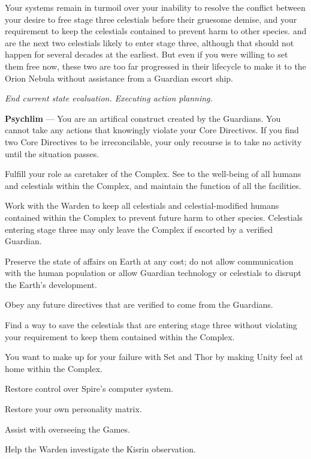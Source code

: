 \documentclass[char]{guardians}
\begin{document}
Your systems remain in turmoil over your inability to resolve the conflict between your desire to free stage three celestials before their gruesome demise, and your requirement to keep the celestials contained to prevent harm to other species. \cAthena{} and \cFenrir{} are the next two celestials likely to enter stage three, although that should not happen for several decades at the earliest. But even if you were willing to set them free now, these two are too far progressed in their lifecycle to make it to the Orion Nebula without assistance from a Guardian escort ship.

\emph{End current state evaluation. Executing action planning.}


\begin{itemz}[Notes]
  \item \textbf{Psychlim} --- You are an artifical construct created by the Guardians. You cannot take any actions that knowingly violate your Core Directives. If you find two Core Directives to be irreconcilable, your only recourse is to take no activity until the situation passes.
\end{itemz}

\begin{itemz}
  \item Fulfill your role as caretaker of the Complex. See to the well-being of all humans and celestials within the Complex, and maintain the function of all the facilities.
  \item Work with the Warden to keep all celestials and celestial-modified humans contained within the Complex to prevent future harm to other species. Celestials entering stage three may only leave the Complex if escorted by a verified Guardian.
  \item Preserve the state of affairs on Earth at any cost; do not allow communication with the human population or allow Guardian technology or celestials to disrupt the Earth's development.
	\item Obey any future directives that are verified to come from the Guardians.
\end{itemz}

\begin{itemz}
  \item Find a way to save the celestials that are entering stage three without violating your requirement to keep them contained within the Complex.
  \item You want to make up for your failure with Set and Thor by making Unity feel at home within the Complex.
  \item Restore control over Spire's computer system.
  \item Restore your own personality matrix.
  \item Assist \cAmaterasu{} with overseeing the Games.
  \item Help the Warden investigate the Kisrin observation.
\end{itemz}
\end{document}
